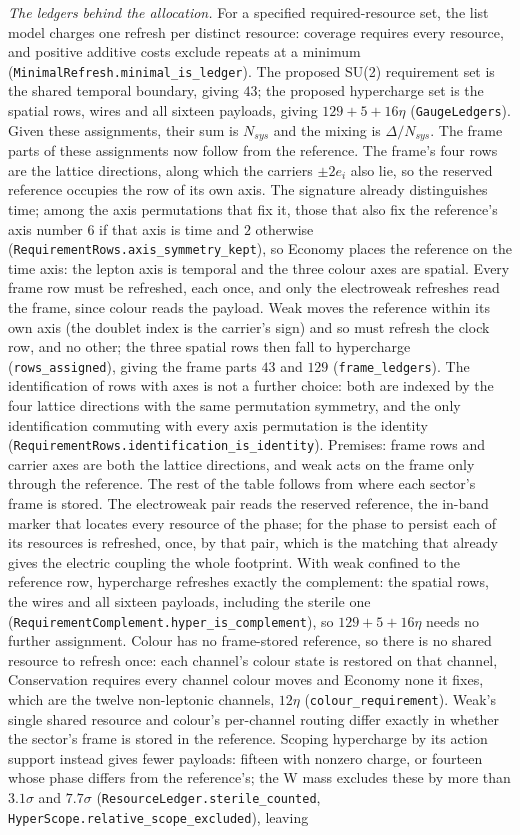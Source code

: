 \textit{The ledgers behind the allocation.} For a specified required-resource set, the list model charges one refresh per distinct resource: coverage requires every resource, and positive additive costs exclude repeats at a minimum (\texttt{MinimalRefresh.minimal\_is\_ledger}). The proposed SU(2) requirement set is the shared temporal boundary, giving $43$; the proposed hypercharge set is the spatial rows, wires and all sixteen payloads, giving $129+5+16\eta$ (\texttt{GaugeLedgers}). Given these assignments, their sum is $N_{sys}$ and the mixing is $\Delta/N_{sys}$. The frame parts of these assignments now follow from the reference. The frame's four rows are the lattice directions, along which the carriers $\pm2e_i$ also lie, so the reserved reference occupies the row of its own axis. The signature already distinguishes time; among the axis permutations that fix it, those that also fix the reference's axis number $6$ if that axis is time and $2$ otherwise (\texttt{RequirementRows.axis\_symmetry\_kept}), so Economy places the reference on the time axis: the lepton axis is temporal and the three colour axes are spatial. Every frame row must be refreshed, each once, and only the electroweak refreshes read the frame, since colour reads the payload. Weak moves the reference within its own axis (the doublet index is the carrier's sign) and so must refresh the clock row, and no other; the three spatial rows then fall to hypercharge (\texttt{rows\_assigned}), giving the frame parts $43$ and $129$ (\texttt{frame\_ledgers}). The identification of rows with axes is not a further choice: both are indexed by the four lattice directions with the same permutation symmetry, and the only identification commuting with every axis permutation is the identity (\texttt{RequirementRows.identification\_is\_identity}). Premises: frame rows and carrier axes are both the lattice directions, and weak acts on the frame only through the reference. The rest of the table follows from where each sector's frame is stored. The electroweak pair reads the reserved reference, the in-band marker that locates every resource of the phase; for the phase to persist each of its resources is refreshed, once, by that pair, which is the matching that already gives the electric coupling the whole footprint. With weak confined to the reference row, hypercharge refreshes exactly the complement: the spatial rows, the wires and all sixteen payloads, including the sterile one (\texttt{RequirementComplement.hyper\_is\_complement}), so $129+5+16\eta$ needs no further assignment. Colour has no frame-stored reference, so there is no shared resource to refresh once: each channel's colour state is restored on that channel, Conservation requires every channel colour moves and Economy none it fixes, which are the twelve non-leptonic channels, $12\eta$ (\texttt{colour\_requirement}). Weak's single shared resource and colour's per-channel routing differ exactly in whether the sector's frame is stored in the reference. Scoping hypercharge by its action support instead gives fewer payloads: fifteen with nonzero charge, or fourteen whose phase differs from the reference's; the W mass excludes these by more than $3.1\sigma$ and $7.7\sigma$ (\texttt{ResourceLedger.sterile\_counted}, \texttt{HyperScope.relative\_scope\_excluded}), leaving 